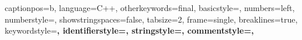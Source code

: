 \usepackage{pgfmath} %
\usepackage{graphicx} %

 {
    captionpos=b,
    language=C++,
    otherkeywords={final},
    basicstyle=\footnotesize,
    numbers=left,
    numberstyle=\small,
    showstringspaces=false,
    tabsize=2,
    frame=single,
    breaklines=true,
    keywordstyle=\bfseries\color[RGB]{127,0,85},
    identifierstyle=\color[RGB]{0,0,192},
    stringstyle=\color[RGB]{42,0,255},
    commentstyle=\color[RGB]{63,127,95},
}


\usepackage[ruled, vlined, linesnumbered]{algorithm2e}
\DontPrintSemicolon
{}

\usepackage[bookmarks=false]{hyperref}
\hypersetup{
    colorlinks,
    citecolor=black,
    filecolor=black,
    linkcolor=black,
    urlcolor=black
}
\def\chapterautorefname{Chapter}
\def\sectionautorefname{Section}
\def\subsectionautorefname{Subsection}
\def\algorithmautorefname{Algorithm}
\def\subfigureautorefname{Figure}

